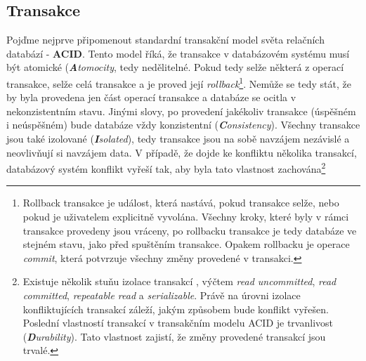 
\subsection{Transakce}
Pojďme nejprve připomenout standardní transakční model světa relačních databází - \textbf{ACID}. Tento model říká, že transakce v databázovém systému musí být atomické (\textit{\textbf{A}tomocity}, tedy nedělitelné. Pokud tedy selže některá z operací transakce, selže celá transakce a je proved její \textit{rollback}\footnote{Rollback transakce je událost, která nastává, pokud transakce selže, nebo pokud je uživatelem explicitně vyvolána. Všechny kroky, které byly v rámci transakce provedeny jsou vráceny, po rollbacku transakce je tedy databáze ve stejném stavu, jako před spuštěním transakce. Opakem rollbacku je operace \textit{commit}, která potvrzuje všechny změny provedené v transakci.}. Nemůže se tedy stát, že by byla provedena jen část operací transakce a databáze se ocitla v nekonzistentním stavu. Jinými slovy, po provedení jakékoliv transakce (úspěšném i neúspěšném) bude databáze vždy konzistentní (\textit{\textbf{C}onsistency}). Všechny transakce jsou také izolované (\textit{\textbf{I}solated}), tedy transakce jsou na sobě navzájem nezávislé a neovlivňují si navzájem data. V případě, že dojde ke konfliktu několika transakcí, databázový systém konflikt vyřeší tak, aby byla tato vlastnost zachována\footnote{Existuje několik stuňu izolace transakcí , výčtem \textit{read uncommitted}, \textit{read committed}, \textit{repeatable read} a \textit{serializable}. Právě na úrovni izolace konfliktujících transakcí záleží, jakým způsobem bude konflikt vyřešen. Poslední vlastností transakcí v transakčním modelu ACID je trvanlivost (\textit{\textbf{D}urability}). Tato vlastnost zajistí, že změny provedené transakcí jsou trvalé. 

}
